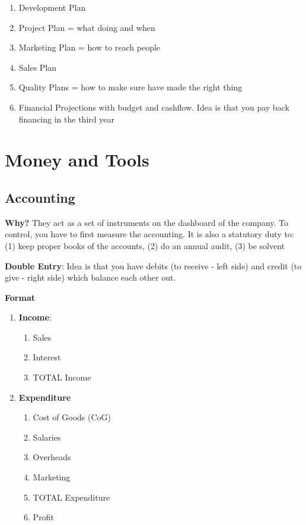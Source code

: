 \documentclass{article}
\begin{document}
\begin{multicols}{2}
\begin{enumerate}
\begin{itemize}
\begin{itemize}
            \end{itemize}
        \end{itemize}
    \item Development Plan
    \item Project Plan = what doing and when
    \item Marketing Plan = how to reach people
    \item Sales Plan
    \item Quality Plans = how to make sure have made the right thing
    \item Financial Projections with budget and cashflow. Idea is that you pay back financing in the third year
\end{enumerate}


\section{Money and Tools}
\subsection{Accounting}
\textbf{Why?} They act as a set of instruments on the dashboard of the company. To control, you have to first measure the accounting. It is also a statutory duty to: (1) keep proper books of the accounts, (2) do an annual audit, (3) be solvent

\noindent
\textbf{Double Entry}: Idea is that you have debits (to receive - left side) and credit (to give - right side) which balance each other out.

\textbf{Format}
\begin{enumerate}
    \item \textbf{Income}:
    \begin{enumerate}
        \item Sales
        \item Interest
        \item TOTAL Income
    \end{enumerate}
    \item \textbf{Expenditure}
    \begin{enumerate}
        \item Cost of Goods (CoG)
        \item Salaries
        \item Overheads
        \item Marketing
        \item TOTAL Expenditure
        \item Profit
    \end{enumerate}
\end{enumerate}


\end{multicols}
\end{document}
